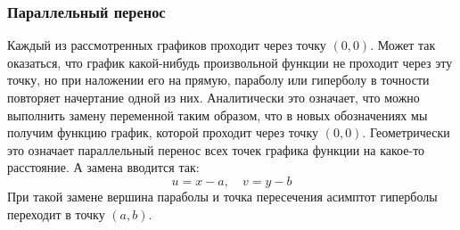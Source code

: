 \documentclass[algebra,twocolumn]{pum}
\begin{document}
\pagebreak
\subsubsection*{Параллельный перенос}
Каждый из рассмотренных графиков проходит через точку $(0,0)$. Может так оказаться, что график какой-нибудь произвольной функции не проходит через эту точку, но при наложении его на прямую, параболу или гиперболу в точности повторяет начертание одной из них. Аналитически это означает, что можно выполнить замену переменной таким образом, что в новых обозначениях мы получим функцию график, которой проходит через точку $(0,0)$. Геометрически это означает параллельный перенос всех точек графика функции на какое-то расстояние. А замена вводится так:
\begin{equation*}
  u=x-a,\quad v=y-b
\end{equation*}
При такой замене вершина параболы и точка пересечения асимптот гиперболы переходит в точку $(a,b)$.
\end{document}

